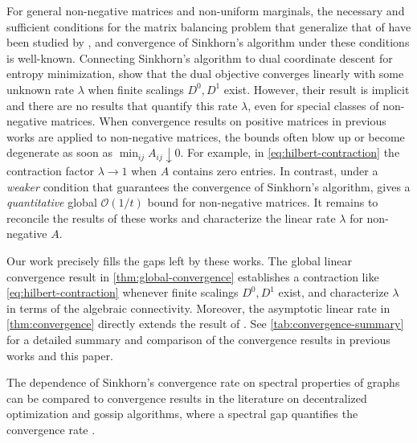 For general non-negative matrices and non-uniform marginals, the necessary and sufficient conditions for the matrix balancing problem that generalize that of \citet{sinkhorn1967concerning} have been studied by \citet{thionet1964note,bacharach1965estimating,brualdi1968convex,menon1968matrix,djokovic1970note,sinkhorn1974diagonal,balakrishnan2004polynomial,pukelsheim2009iterative}, and convergence of Sinkhorn's algorithm under these conditions is well-known. Connecting Sinkhorn's algorithm to dual coordinate descent for entropy minimization, \citet{luo1992convergence} show that the dual objective converges linearly with some unknown rate $\lambda$ when finite scalings $D^0,D^1$ exist. However, their result is implicit and there are no results that quantify this rate $\lambda$, even for special classes of non-negative matrices. When convergence results on positive matrices in previous works are applied to non-negative matrices, the bounds often blow up or become degenerate as soon as $\min_{ij}A_{ij} \downarrow 0$. For example, in \eqref{eq:hilbert-contraction} the contraction factor $\lambda \rightarrow 1$ when $A$ contains zero entries. In contrast, under a \emph{weaker} condition that guarantees the convergence of Sinkhorn's algorithm, \citet{leger2021gradient} gives a \emph{quantitative} global $\mathcal{O}(1/t)$ bound for non-negative matrices. It remains to reconcile the results of these works and characterize the linear rate $\lambda$ for non-negative $A$.

Our work precisely fills the gaps left by these works. The global linear convergence result in \cref{thm:global-convergence} establishes a contraction like \eqref{eq:hilbert-contraction} whenever finite scalings $D^0,D^1$ exist, and characterize $\lambda$ in terms of the algebraic connectivity. Moreover, the asymptotic linear rate in \cref{thm:convergence} directly extends the result of \citet{knight2008sinkhorn}. See \cref{tab:convergence-summary} for a detailed summary and comparison of the convergence results in previous works and this paper.

The dependence of Sinkhorn's convergence rate on spectral properties of graphs can be compared to convergence results in the  literature on decentralized optimization and gossip algorithms, where a spectral gap quantifies the convergence rate \citep{boyd2006randomized,xiao2007distributed}.
 
